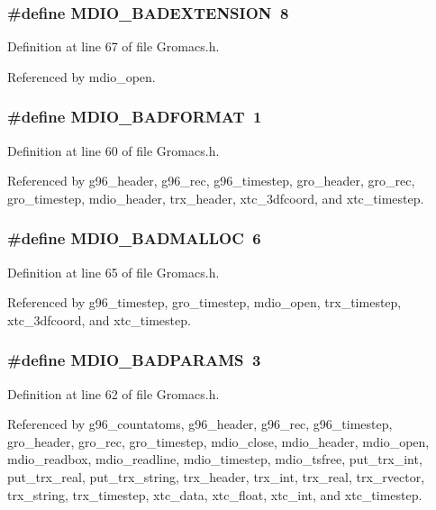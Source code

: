 \subsubsection{\setlength{\rightskip}{0pt plus 5cm}\#define MDIO\_\-BADEXTENSION\ 8}\label{Gromacs_8h_a9}




Definition at line 67 of file Gromacs.h.

Referenced by mdio\_\-open.
\subsubsection{\setlength{\rightskip}{0pt plus 5cm}\#define MDIO\_\-BADFORMAT\ 1}\label{Gromacs_8h_a2}




Definition at line 60 of file Gromacs.h.

Referenced by g96\_\-header, g96\_\-rec, g96\_\-timestep, gro\_\-header, gro\_\-rec, gro\_\-timestep, mdio\_\-header, trx\_\-header, xtc\_\-3dfcoord, and xtc\_\-timestep.
\subsubsection{\setlength{\rightskip}{0pt plus 5cm}\#define MDIO\_\-BADMALLOC\ 6}\label{Gromacs_8h_a7}




Definition at line 65 of file Gromacs.h.

Referenced by g96\_\-timestep, gro\_\-timestep, mdio\_\-open, trx\_\-timestep, xtc\_\-3dfcoord, and xtc\_\-timestep.
\subsubsection{\setlength{\rightskip}{0pt plus 5cm}\#define MDIO\_\-BADPARAMS\ 3}\label{Gromacs_8h_a4}




Definition at line 62 of file Gromacs.h.

Referenced by g96\_\-countatoms, g96\_\-header, g96\_\-rec, g96\_\-timestep, gro\_\-header, gro\_\-rec, gro\_\-timestep, mdio\_\-close, mdio\_\-header, mdio\_\-open, mdio\_\-readbox, mdio\_\-readline, mdio\_\-timestep, mdio\_\-tsfree, put\_\-trx\_\-int, put\_\-trx\_\-real, put\_\-trx\_\-string, trx\_\-header, trx\_\-int, trx\_\-real, trx\_\-rvector, trx\_\-string, trx\_\-timestep, xtc\_\-data, xtc\_\-float, xtc\_\-int, and xtc\_\-timestep.
